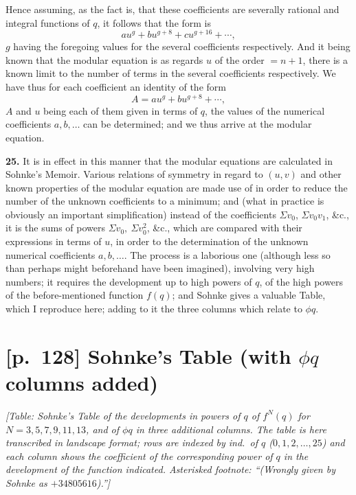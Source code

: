 \documentclass[11pt]{article}
\begin{document}
Hence assuming, as the fact is, that these coefficients are severally
rational and integral functions of $q$, it follows that the form is
\[
a u^g + b u^{g+8} + c u^{g+16} + \cdots,
\]
$g$ having the foregoing values for the several coefficients respectively.
And it being known that the modular equation is as regards $u$ of the order
$=n+1$, there is a known limit to the number of terms in the several
coefficients respectively. We have thus for each coefficient an identity of
the form
\[
A = a u^g + b u^{g+8} + \cdots,
\]
$A$ and $u$ being each of them given in terms of $q$, the values of the
numerical coefficients $a, b, \ldots$ can be determined; and we thus arrive
at the modular equation.

\medskip
\textbf{25.} It is in effect in this manner that the modular equations are
calculated in Sohnke's Memoir. Various relations of symmetry in regard to
$(u, v)$ and other known properties of the modular equation are made use of
in order to reduce the number of the unknown coefficients to a minimum;
and (what in practice is obviously an important simplification) instead of
the coefficients $\Sigma v_0$, $\Sigma v_0 v_1$, \&c., it is the sums of
powers $\Sigma v_0,\ \Sigma v_0^2$, \&c., which are compared with their
expressions in terms of $u$, in order to the determination of the unknown
numerical coefficients $a, b, \ldots$. The process is a laborious one
(although less so than perhaps might beforehand have been imagined),
involving very high numbers; it requires the development up to high powers
of $q$, of the high powers of the before-mentioned function $f(q)$; and
Sohnke gives a valuable Table, which I reproduce here; adding to it the
three columns which relate to $\phi q$.

\clearpage
\section*{[p.~128] Sohnke's Table (with $\phi q$ columns added)}

\textit{[Table: Sohnke's Table of the developments in powers of $q$ of
$f^N(q)$ for $N = 3, 5, 7, 9, 11, 13$, and of $\phi q$ in three additional
columns. The table is here transcribed in landscape format; rows are
indexed by ind.\ of $q$ ($0, 1, 2, \ldots, 25$) and each column shows the
coefficient of the corresponding power of $q$ in the development of the
function indicated. Asterisked footnote: ``(Wrongly given by Sohnke as
$+34805616$).'']}
\end{document}
